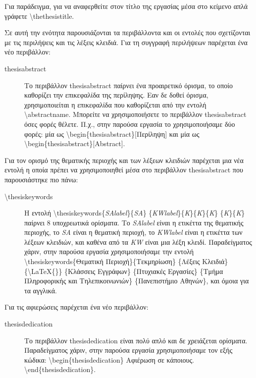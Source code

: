 \documentclass[english]{dithesis} %
\begin{document}
Για παράδειγμα, για να αναφερθείτε στον τίτλο της εργασίας μέσα στο κείμενο
απλά γράφετε \textbackslash{thethesistitle}.

Σε αυτή την ενότητα παρουσιάζονται τα περιβάλλοντα και οι εντολές που
σχετίζονται με τις περιλήψεις και τις λέξεις κλειδιά.
Για τη συγγραφή περιλήψεων παρέχεται ένα νέο περιβάλλον:
\begin{description}
\item[thesisabstract]
  Το περιβάλλον thesisabstract παίρνει ένα προαιρετικό όρισμα, το οποίο
  καθορίζει την επικεφαλίδα της περίληψης.
  Εαν δε δοθεί όρισμα, χρησιμοποιείται η επικεφαλίδα που καθορίζεται από
  την εντολή \textbackslash{abstractname}.
  Μπορείτε να χρησιμοποιήσετε το περιβάλλον thesisabstract όσες φορές θέλετε.
  Π.χ., στην παρούσα εργασία το χρησιμοποιήσαμε δύο φορές:
  μία ως \textbackslash{begin}\{thesisabstract\}{[}Περίληψη{]} και μία
  ως \textbackslash{begin}\{thesisabstract\}{[Abstract]}.
\end{description}
Για τον ορισμό της θεματικής περιοχής και των λέξεων κλειδιών παρέχεται μια
νέα εντολή η οποία πρέπει να χρησιμοποιηθεί μέσα στο περιβάλλον thesisabstract
που παρουσιάστηκε πιο πάνω:
\begin{description}
\item[\textbackslash{thesiskeywords}]
  Η εντολή \textbackslash{thesiskeywords}\{\textit{SAlabel}\}\{\textit{SA}\}%
  \{\textit{KWlabel}\}\{\textit{K}\}\{\textit{K}\}\{\textit{K}\}%
  \{\textit{K}\}\{\textit{K}\} παίρνει 8 υποχρεωτικά ορίσματα.
  Το \textit{SAlabel} είναι η ετικέττα της θεματικής περιοχής,
  το \textit{SA} είναι η θεματική περιοχή, το \textit{KWlabel} είναι
  η ετικέττα των λέξεων κλειδιών, και καθένα από τα \textit{KW} είναι μια λέξη
  κλειδί.
  Παραδείγματος χάριν, στην παρούσα εργασία χρησιμοποιήσαμε την εντολή
  \textbackslash{thesiskeywords}\{Θεματική Περιοχή\}\{Τεκμηρίωση\}
  \{Λέξεις Κλειδιά\} \{\textbackslash{LaTeX}\{\}\} \{Κλάσσεις Εγγράφων\}
  \{Πτυχιακές Εργασίες\} \{Τμήμα Πληροφορικής και Τηλεπικοινωνιών\}
  \{Πανεπιστήμιο Αθηνών\}, και όμοια για τα αγγλικά.
\end{description}

Για τις αφιερώσεις παρέχεται ένα νέο περιβάλλον:
\begin{description}
\item[thesisdedication]
  Το περιβάλλον thesisdedication είναι πολύ απλό και δε χρειάζεται ορίσματα.
  Παραδείγματος χάριν, στην παρούσα εργασία χρησιμοποιήσαμε τον εξής κώδικα:
  \textbackslash{begin}\{thesisdedication\} Αφιέρωση σε κάποιους.
  \textbackslash{end}\{thesisdedication\}.
\end{description}
\end{document}
